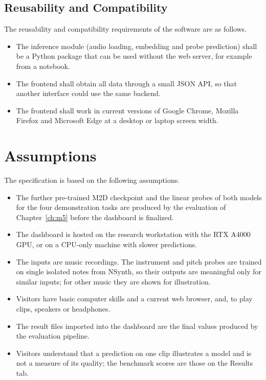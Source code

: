 \documentclass{FastFyp}
\begin{document}
\subsection{Reusability and Compatibility}
The reusability and compatibility requirements of the software are as follows.
\begin{itemize}
  \item The inference module (audio loading, embedding and probe prediction) shall be a Python package that can be used without the web server, for example from a notebook.
  \item The frontend shall obtain all data through a small JSON API, so that another interface could use the same backend.
  \item The frontend shall work in current versions of Google Chrome, Mozilla Firefox and Microsoft Edge at a desktop or laptop screen width.
\end{itemize}

\section{Assumptions}
\label{sec:srs-assumptions}
The specification is based on the following assumptions.
\begin{itemize}
  \item The further pre-trained M2D checkpoint and the linear probes of both models for the four demonstration tasks are produced by the evaluation of Chapter~\ref{ch:m5} before the dashboard is finalized.
  \item The dashboard is hosted on the research workstation with the RTX A4000 GPU, or on a CPU-only machine with slower predictions.
  \item The inputs are music recordings. The instrument and pitch probes are trained on single isolated notes from NSynth, so their outputs are meaningful only for similar inputs; for other music they are shown for illustration.
  \item Visitors have basic computer skills and a current web browser, and, to play clips, speakers or headphones.
  \item The result files imported into the dashboard are the final values produced by the evaluation pipeline.
  \item Visitors understand that a prediction on one clip illustrates a model and is not a measure of its quality; the benchmark scores are those on the Results tab.
\end{itemize}
\end{document}
